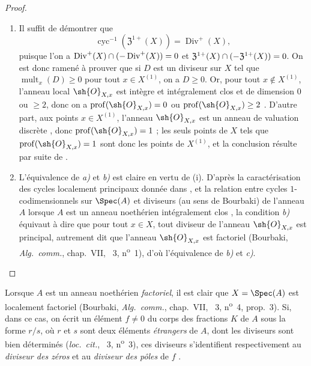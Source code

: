 \begin{proof}
\begin{enumerate}[label=(\roman*)]
  \item Il suffit de démontrer que
\[
\label{IV.21.6.9.1}
  \operatorname{cyc}^{-1}(\mathfrak{Z}^{1+}(X))=\operatorname{Div}^+(X),
  \tag{21.6.9.1}
\]
puisque l'on a $\operatorname{Div}^+(X)\cap(-\operatorname{Div}^+(X))=0$ et $\mathfrak{Z}^{1+}(X)\cap(-\mathfrak{Z}^{1+}(X))=0$.
On est donc ramené à prouver que si $D$ est un diviseur sur $X$ tel que $\operatorname{mult}_x(D)\geq0$ pour tout $x\in X^{(1)}$, on a $D\geq0$.
Or, pour tout $x\notin X^{(1)}$, l'anneau local $\sh{O}_{X,x}$ est intègre et intégralement clos et
de dimension $0$ ou $\geq2$, donc on a $\operatorname{prof}(\sh{O}_{X,x})=0$ ou $\operatorname{prof}(\sh{O}_{X,x})\geq2$ .
D'autre part, aux points $x\in X^{(1)}$, l'anneau $\sh{O}_{X,x}$ est un anneau de valuation discrète , donc $\operatorname{prof}(\sh{O}_{X,x})=1$ ;
les seuls points de $X$ tels que $\operatorname{prof}(\sh{O}_{X,x})=1$ sont donc les points de $X^{(1)}$, et la conclusion résulte par suite de .

  \item L'équivalence de \emph{a)} et \emph{b)} est claire en vertu de (i).
D'après la caractérisation des cycles localement principaux donnée dans , et la relation entre cycles $1$-codimensionnels sur $\Spec(A)$ et diviseurs (au sens de Bourbaki) de l'anneau $A$ lorsque $A$ est un anneau noethérien intégralement clos , la condition \emph{b)} équivaut à dire que pour tout $x\in X$, tout diviseur de l'anneau $\sh{O}_{X,x}$ est principal, autrement dit que l'anneau $\sh{O}_{X,x}$ est factoriel (Bourbaki, \emph{Alg.\ comm.}, chap.~VII, \textsection~3, n\textsuperscript{o}~1), d'où l'équivalence de \emph{b)} et \emph{c)}.
\end{enumerate}
\end{proof}

\begin{env}[21.6.9.2]
\label{IV.21.6.9.2}
Lorsque $A$ est un anneau noethérien \emph{factoriel}, il est clair que $X=\Spec(A)$ est localement factoriel (Bourbaki, \emph{Alg.\ comm.}, chap.~VII, \textsection~3, n\textsuperscript{o}~4, prop.~3).
Si, dans ce cas, on écrit un élément $f\neq0$ du corps des fractions $K$ de $A$ sous la forme $r/s$, où $r$ et $s$ sont deux éléments \emph{étrangers} de $A$, dont les diviseurs sont bien déterminés (\emph{loc.\ cit.}, \textsection~3, n\textsuperscript{o}~3), ces diviseurs s'identifient respectivement au \emph{diviseur des zéros} et au \emph{diviseur des pôles} de $f$ .
\end{env}

